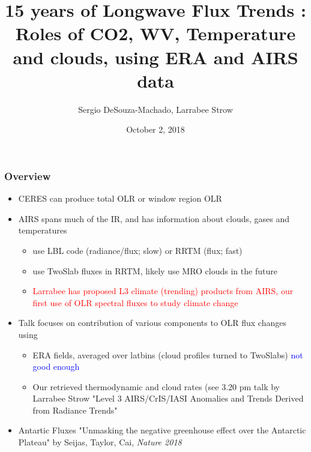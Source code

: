 \documentclass[10pt,t]{beamer}
\begin{document}
\title[]{15 years of Longwave Flux Trends : \newline
  Roles of CO2, WV, Temperature and clouds, \newline
  using ERA and AIRS data}
\author{Sergio DeSouza-Machado, Larrabee Strow}
\date{October 2, 2018}
\begin{frame}
  \titlepage
\end{frame}
\begin{frame}
  \frametitle{Overview}
  \begin{itemize}
  \item CERES can produce total OLR or window region OLR
  \item AIRS spans much of the IR, and has information about clouds, gases and temperatures
    \begin{itemize}    
    \item use LBL code (radiance/flux; slow) or RRTM (flux; fast)
    \item use TwoSlab fluxes in RRTM, likely use MRO clouds in the future
    \item \textcolor{red}{Larrabee has proposed L3 climate (trending) products from AIRS, our first use of
          OLR spectral fluxes to study climate change}
    \end{itemize}
  \item Talk focuses on contribution of various components to OLR flux changes using
    \begin{itemize}
    \item ERA fields, averaged over latbins (cloud profiles turned to TwoSlabs) \textcolor{blue}{not good enough}
    \item Our retrieved thermodynamic and cloud rates (see 3.20 pm talk by Larrabee Strow "Level 3
      AIRS/CrIS/IASI Anomalies and Trends Derived from Radiance Trends"
    \end{itemize}
  \item Antartic Fluxes "Unmasking the negative greenhouse effect over the Antarctic Plateau" by Seijas, Taylor, Cai, \emph{Nature 2018}    
  \end{itemize}
\end{frame}
\end{document}
